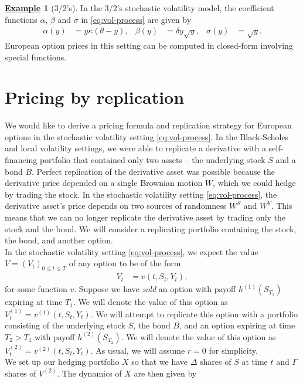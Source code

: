 \documentclass[12pt]{book}
\numberwithin{equation}{chapter}
\theoremstyle{plain}
\numberwithin{theorem}{section}
\theoremstyle{definition}
\newtheorem{example}[theorem]{\underline{Example}}
\numberwithin{exercise}{chapter}
\newcommand{\<}{\langle}
\renewcommand{\>}{\rangle}
\renewcommand{\(}{\left(}
\renewcommand{\)}{\right)}
\renewcommand{\[}{\left[}
\renewcommand{\]}{\right]}
\newcommand\sig{\sigma}
\newcommand\Del{\Delta}
\theoremstyle{definition}
\numberwithin{question}{section}
\begin{document}
\begin{example}[3/2's]
In the 3/2's stochastic volatility model, the coefficient functions $\alpha$, $\beta$ and $\sig$ in \eqref{eq:vol-process} are given by
\begin{align}
\alpha (y) 
	&= y \kappa (\theta -y) , &
\beta(y) 
	&= \delta y \sqrt{y} , &
\sigma(y) 
	&= \sqrt{y} .
\end{align}
European option prices in this setting can be computed in closed-form involving special functions.
\end{example}

\section{Pricing by replication}
We would like to derive a pricing formula and replication strategy for European options in the stochastic volatility setting \eqref{eq:vol-process}. 
In the Black-Scholes and local volatility settings, we were able to replicate a derivative with a self-financing portfolio that contained only two assets -- the underlying stock $S$ and a bond $B$.  Perfect replication of the derivative asset was possible because the derivative price depended on a single Brownian motion $W$, which we could hedge by trading the stock.  
In the stochastic volatility setting \eqref{eq:vol-process}, the derivative asset's price depends on two sources of randomness $W^S$  and  $W^Y$. This means that we can no longer replicate the derivative asset by trading  only the stock and the bond.  We will consider a replicating portfolio containing the stock, the bond, and another option.
\\[0.5em]
In the stochastic volatility setting \eqref{eq:vol-process}, we expect the value $V=(V_t)_{0 \leq t \leq T}$ of any option to be of the form
\begin{align}
V_t 
	&= v(t, S_t, Y_t) ,
\end{align}
for some function $v$.  Suppose we have \textit{sold} an option with payoff $h^{(1)}(S_{T_1})$ expiring at time $T_1$.
We will denote the value of this option as $V_t^{(1)} = v^{(1)}(t,S_t,Y_t)$. 
We will attempt to replicate this option with a portfolio consisting of the underlying stock $S$, the bond $B$, and an option expiring at time $T_2 > T_1$ with payoff $h^{(2)}(S_{T_2})$.
We will denote the value of this option as $V_t^{(2)} = v^{(2)}(t,S_t,Y_t)$.
As usual, we will assume $r=0$ for simplicity.
\\[0.5em]
We set up our hedging portfolio $X$ so that we have $\Del$ shares of $S$ at time $t$ and $\Gamma$ shares of $V^{(2)}$.  The dynamics of $X$ are then given by
\end{document}
